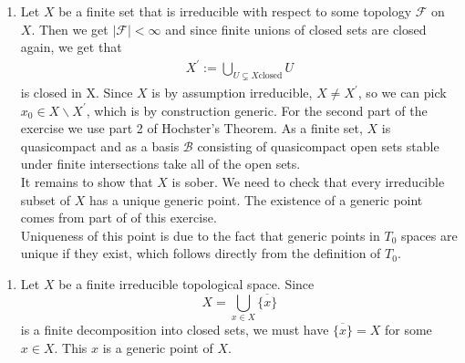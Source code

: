 \newcommand{\sheet}{3}




\maketitle{}

\begin{exercise}{1}
    \begin{enumerate}
        \item Let $X$ be a finite set that is irreducible with 
        respect to some topology $\mathcal{F}$ on $X$. Then we get
        $\mid \mathcal{F} \mid<\infty$ and since finite unions of
        closed sets are closed again, we get that
        \begin{align*}
            X^{\prime}:=\bigcup_{U \subsetneq X \text{closed}}{U}
        \end{align*}
        is closed in X. Since $X$ is by assumption irreducible,
        $X\neq X^{\prime}$, so we can pick $x_0\in X \backslash X^{\prime}$,
        which is by construction generic. For the second part of the exercise we use 
        part 2 of Hochster's Theorem. As a finite set, $X$ is 
        quasicompact and as a basis $\mathcal{B}$ consisting of quasicompact 
        open sets stable under finite intersections take all of the open sets. \\
        It remains to show that $X$ is sober. We need to check that every irreducible
        subset of $X$ has a unique generic point. The existence of a generic point comes
        from part of of this exercise. \\
        Uniqueness of this point is due to the fact
        that generic points in $T_0$ spaces are unique if they exist, which follows directly
        from the definition of $T_0$. 
    \end{enumerate}
    
    \begin{enumerate}
        \item{
                Let $X$ be a finite irreducible topological space. Since
                \begin{equation*} X = \bigcup_{x \in X} \overline{\{x\}}
                \end{equation*} is a finite decomposition into closed sets, we
                must have $\overline{\{x\}} = X$ for some $x \in X$. This $x$ is
                a generic point of $X$.

}
\end{enumerate}
\end{exercise}

